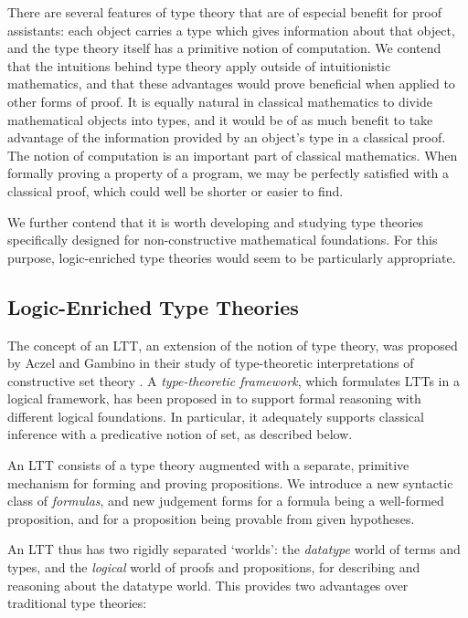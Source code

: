 \documentclass[acmtocl]{acmtrans2m}
\begin{document}
There are several features of type theory that are of especial benefit for proof assistants: each object carries
a type which gives information about that object, and the type theory itself has a primitive notion of computation.
We contend that the intuitions behind type theory apply outside of
intuitionistic mathematics, and that these advantages
would prove beneficial when applied to other forms of proof.  It is
equally natural in classical mathematics to divide mathematical
objects into types, and it would be of as much benefit to take
advantage of the information provided by an object's type in a
classical proof.  The notion of computation is an important part of
classical mathematics.  When formally proving a property of a
program, we may be perfectly satisfied with a classical proof, which
could well be shorter or easier to find.

We further contend that it is worth developing and studying type
theories specifically designed for non-constructive mathematical
foundations.  For this purpose,
logic-enriched type theories would seem to be particularly appropriate.

\subsection{Logic-Enriched Type Theories}

The concept of an LTT, an extension of the notion of type theory,
was proposed by Aczel and Gambino in their study of type-theoretic
interpretations of constructive set theory
\cite{ag:cpdtt,ga:gticst}.
A \emph{type-theoretic framework}, which
formulates LTTs in a logical framework, has been proposed in
\cite{luo:LTT06} to support formal reasoning with different logical
foundations.  In particular, it adequately supports classical
inference with a predicative notion of set, as described below.



An LTT consists of a type theory augmented with a separate,
primitive mechanism for forming and proving propositions.  We
introduce a new syntactic class of \emph{formulas}, and new
judgement forms for a formula being a well-formed proposition, and
for a proposition being provable from given hypotheses.


An LTT thus has two rigidly separated `worlds': the
\emph{datatype} world of terms and types, and the \emph{logical}
world of proofs and propositions, for describing and
reasoning about the datatype world.  This provides two advantages over traditional type theories:
\end{document}
